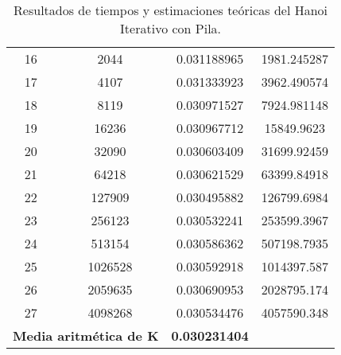 \documentclass[a4paper,12pt]{article} %
\begin{document}
\begin{table}[H]
{\begin{tabular}{|c|c|c|c|}
			16                                                 & 2044                 & 0.031188965              & 1981.245287                                          \\
			17                                                 & 4107                 & 0.031333923              & 3962.490574                                          \\
			18                                                 & 8119                 & 0.030971527              & 7924.981148                                          \\
			19                                                 & 16236                & 0.030967712              & 15849.9623                                           \\
			20                                                 & 32090                & 0.030603409              & 31699.92459                                          \\
			21                                                 & 64218                & 0.030621529              & 63399.84918                                          \\
			22                                                 & 127909               & 0.030495882              & 126799.6984                                          \\
			23                                                 & 256123               & 0.030532241              & 253599.3967                                          \\
			24                                                 & 513154               & 0.030586362              & 507198.7935                                          \\
			25                                                 & 1026528              & 0.030592918              & 1014397.587                                          \\
			26                                                 & 2059635              & 0.030690953              & 2028795.174                                          \\
			27                                                 & 4098268              & 0.030534476              & 4057590.348                                          \\
			\hline
			\multicolumn{2}{l}{\textbf{Media aritmética de K}} & \textbf{0.030231404}                                                                                   \\
			\hline
		\end{tabular}
	}
	\caption{Resultados de tiempos y estimaciones teóricas del Hanoi Iterativo con Pila.}
	\label{tab:tiempos}
\end{table}
\end{document}
